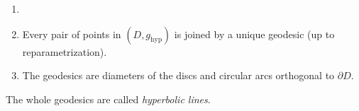 \documentclass[12pt]{article}
\begin{document}
\begin{lemma}
	\begin{enumerate}[\normalfont(i)]
		\item[]
		\item Every pair of points in $(D, g_{\mathrm{hyp}})$ is joined by a unique geodesic (up to reparametrization).
		\item The geodesics are diameters of the discs and circular arcs orthogonal to $\partial D$.%
	\end{enumerate}
\end{lemma}

The whole geodesics are called \emph{hyperbolic lines}.

\newpage

\printindex
\end{document}
